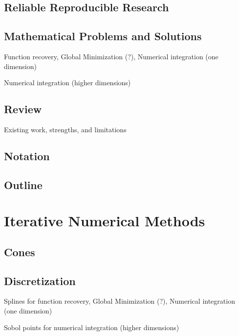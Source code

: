 \documentclass[acmtoms]{doc_acmtrans2m}
\begin{document}
\subsection{Reliable Reproducible Research}  



\subsection{Mathematical Problems and Solutions} \label{sec:prob}
 

Function recovery, Global Minimization (?), Numerical integration (one dimension)

Numerical integration (higher dimensions)

\subsection{Review} \label{sec:lit}
 

Existing work, strengths, and limitations

\subsection{Notation} \label{sec:not}

\subsection{Outline} \label{sec:lit}

\section{Iterative Numerical Methods} 
\label{sec:meth}
 
\subsection{Cones} \label{sec:cones}


\subsection{Discretization} \label{sec:dis}
Splines for function recovery, Global Minimization (?), Numerical integration (one dimension)
 
Sobol points for numerical integration (higher dimensions)
\end{document}
